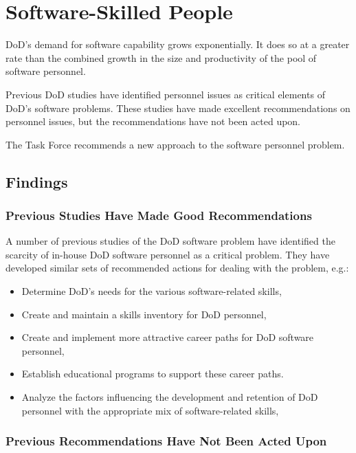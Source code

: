 \documentclass[12pt,final]{article}
\begin{document}
\section{Software-Skilled People}

DoD’s demand for software capability grows exponentially. It does so at a
greater rate than the combined growth in the size and productivity of the pool
of software personnel.

Previous DoD studies have identified personnel issues as critical elements of
DoD’s software problems. These studies have made excellent recommendations on
personnel issues, but the recommendations have not been acted upon.

The Task Force recommends a new approach to the software personnel problem.

\subsection*{Findings}

\subsubsection*{Previous Studies Have Made Good Recommendations}

A number of previous studies of the DoD software problem have identified the
scarcity of in-house DoD software personnel as a critical problem. They have
developed similar sets of recommended actions for dealing with the problem,
e.g.:

\begin{itemize}
    \item Determine DoD’s needs for the various software-related skills,
    \item Create and maintain a skills inventory for DoD personnel,
    \item Create and implement more attractive career paths for DoD software
        personnel,
    \item Establish educational programs to support these career paths.
    \item Analyze the factors influencing the development and retention of DoD
        personnel with the appropriate mix of software-related skills,
\end{itemize}

\subsubsection*{Previous Recommendations Have Not Been Acted Upon}
\end{document}
